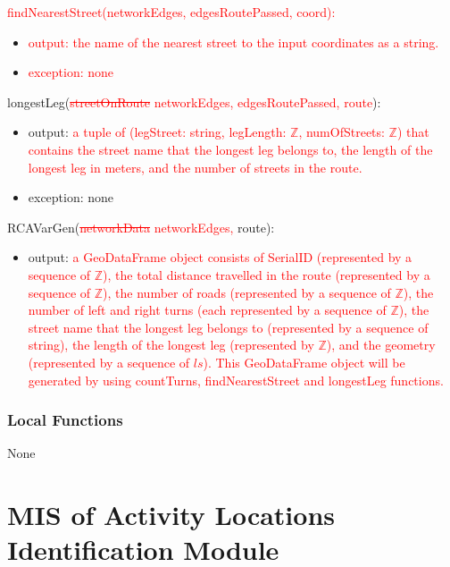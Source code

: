 \documentclass[12pt, titlepage]{article}
\begin{document}
\noindent \textcolor{red}{findNearestStreet(networkEdges, edgesRoutePassed, coord):}
\begin{itemize}
    \item \textcolor{red}{output: the name of the nearest street to the input coordinates as a string.}
    \item \textcolor{red}{exception: none}
\end{itemize}

\noindent longestLeg(\textcolor{red}{\sout{streetOnRoute} networkEdges, edgesRoutePassed, route}):
\begin{itemize}
\item output: \textcolor{red}{a tuple of (legStreet: string, legLength: $\mathbb{Z}$, numOfStreets: $\mathbb{Z}$) that contains the street name that the longest leg belongs to, the length of the longest leg in meters, and the number of streets in the route.}
\item exception: none
\end{itemize}

\noindent RCAVarGen(\textcolor{red}{\sout{networkData} networkEdges,} route):
\begin{itemize}
\item output: \textcolor{red}{a GeoDataFrame object consists of SerialID (represented by a sequence of $\mathbb{Z}$), the total distance travelled in the route (represented by a sequence of $\mathbb{Z}$), the number of roads (represented by a sequence of $\mathbb{Z}$), the number of left and right turns (each represented by a sequence of $\mathbb{Z}$), the street name that the longest leg belongs to (represented by a sequence of string), the length of the longest leg (represented by $\mathbb{Z}$), and the geometry (represented by a sequence of $ls$). This GeoDataFrame object will be generated by using countTurns, findNearestStreet and longestLeg functions.}
\end{itemize}

\subsubsection{Local Functions}
None

\newpage

\section{MIS of Activity Locations Identification Module} \label{ALIM} %
\end{document}
